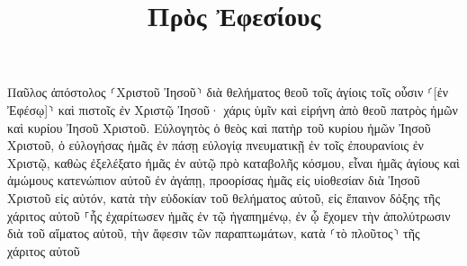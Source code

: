 \documentclass{openreader}
\title{Πρὸς Ἐφεσίους}
\date{}
\begin{document}
\maketitle
\raggedbottom 
\fontsize{16pt}{24pt}\selectfont


Παῦλος ἀπόστολος ⸂Χριστοῦ Ἰησοῦ⸃ διὰ θελήματος θεοῦ τοῖς ἁγίοις τοῖς οὖσιν ⸂[ἐν Ἐφέσῳ]⸃ καὶ πιστοῖς ἐν Χριστῷ Ἰησοῦ· 
χάρις ὑμῖν καὶ εἰρήνη ἀπὸ θεοῦ πατρὸς ἡμῶν καὶ κυρίου Ἰησοῦ Χριστοῦ. 
Εὐλογητὸς ὁ θεὸς καὶ πατὴρ τοῦ κυρίου ἡμῶν Ἰησοῦ Χριστοῦ, ὁ εὐλογήσας ἡμᾶς ἐν πάσῃ εὐλογίᾳ πνευματικῇ ἐν τοῖς ἐπουρανίοις ἐν Χριστῷ, 
καθὼς ἐξελέξατο ἡμᾶς ἐν αὐτῷ πρὸ καταβολῆς κόσμου, εἶναι ἡμᾶς ἁγίους καὶ ἀμώμους κατενώπιον αὐτοῦ ἐν ἀγάπῃ, 
προορίσας ἡμᾶς εἰς υἱοθεσίαν διὰ Ἰησοῦ Χριστοῦ εἰς αὐτόν, κατὰ τὴν εὐδοκίαν τοῦ θελήματος αὐτοῦ, 
εἰς ἔπαινον δόξης τῆς χάριτος αὐτοῦ ⸀ἧς ἐχαρίτωσεν ἡμᾶς ἐν τῷ ἠγαπημένῳ, 
ἐν ᾧ ἔχομεν τὴν ἀπολύτρωσιν διὰ τοῦ αἵματος αὐτοῦ, τὴν ἄφεσιν τῶν παραπτωμάτων, κατὰ ⸂τὸ πλοῦτος⸃ τῆς χάριτος αὐτοῦ 
\end{document}
